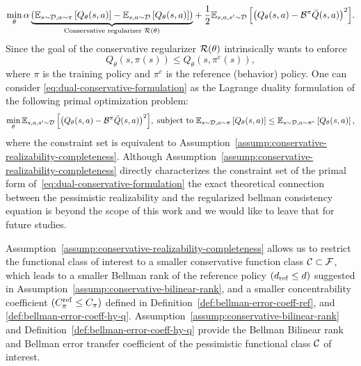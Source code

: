 \begin{align}
    \label{eq:dual-conservative-formulation}
    \min_\theta  {\alpha \underbrace{\left(\mathbb{E}_{s \sim \mathcal{D}, a \sim \pi} \left[Q_\theta(s,a)\right] - \mathbb{E}_{s, a \sim \mathcal{D}}\left[Q_\theta(s,a)\right]\right)}_{\text{Conservative regularizer }\mathcal{R}(\theta)}} + \frac{1}{2} {\mathbb{E}_{s, a, s^\prime\sim \mathcal{D}}\left[\left(Q_\theta(s, a) - \mathcal{B}^\pi\bar{Q}(s, a)\right)^2 \right]}.
\end{align}
Since the goal of the conservative regularizer $\mathcal R(\theta)$ intrinsically wants to enforce
\begin{equation}
    Q_\theta(s,\pi(s)) \leq Q_\theta(s,\pi^e(s)),
\end{equation}
where $\pi$ is the training policy and $\pi^e$ is the reference (behavior) policy. One can consider \eqref{eq:dual-conservative-formulation} as the Lagrange duality formulation of the following primal optimization problem:{\small
\begin{equation}
    \min_\theta    {\mathbb{E}_{s, a, s^\prime\sim \mathcal{D}}\left[\left(Q_\theta(s, a) - \mathcal{B}^\pi\bar{Q}(s, a)\right)^2 \right]},\;\text{subject to}\; \mathbb{E}_{s \sim \mathcal{D}, a \sim \pi} \left[Q_\theta(s,a)\right] \leq \mathbb{E}_{s\sim \mathcal{D},a\sim\pi^e}\left[Q_\theta(s,a)\right],
\end{equation}
}
where the constraint set is equivalent to Assumption~\ref{assump:conservative-realizability-completeness}. Although Assumption~\ref{assump:conservative-realizability-completeness} directly characterizes the constraint set of the primal form of~\eqref{eq:dual-conservative-formulation} the exact theoretical connection between the pessimistic realizability and the regularized bellman consistency equation is beyond the scope of this work and we would like to leave that for future studies.

Assumption~\ref{assump:conservative-realizability-completeness} allows us to restrict the functional class of interest to a smaller conservative function class $\mathcal C\subset\mathcal F$, which leads to a smaller Bellman rank of the reference policy $(d_\mathrm{ref}\leq d)$ suggested in Assumption~\ref{assump:conservative-bilinear-rank}, and a smaller concentrability coefficient $(C^\mathrm{ref}_\pi\leq C_\pi)$ defined in Definition~\ref{def:bellman-error-coeff-ref}, and \ref{def:bellman-error-coeff-hy-q}. Assumption~\ref{assump:conservative-bilinear-rank} and Definition~\ref{def:bellman-error-coeff-hy-q} provide the Bellman Bilinear rank and Bellman error transfer coefficient of the pessimistic functional class $\mathcal C$ of interest.

